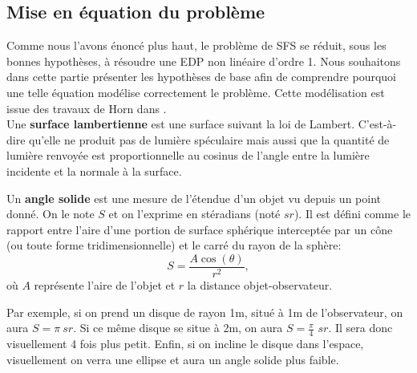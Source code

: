 \subsection{Mise en équation du problème} 

Comme nous l'avons énoncé plus haut, le problème de SFS se réduit, sous les bonnes hypothèses, à résoudre une EDP non linéaire d'ordre 1. Nous souhaitons dans cette partie présenter les hypothèses de base afin de comprendre pourquoi une telle équation modélise correctement le problème. Cette modélisation est issue des travaux de Horn dans \cite{Horn 1986}.\\

Une \textbf{surface lambertienne} est une surface suivant la loi de Lambert. C'est-à-dire qu'elle ne produit pas de lumière spéculaire mais aussi que la quantité de lumière renvoyée est proportionnelle au cosinus de l’angle entre la lumière incidente et la normale à la surface. 

Un \textbf{angle solide} est une mesure de l'étendue d'un objet vu depuis un point donné. On le note $S$ et on l'exprime en stéradians (noté \(sr\)). Il est défini comme le rapport entre l'aire d'une portion de surface sphérique interceptée par un cône (ou toute forme tridimensionnelle) et le carré du rayon de la sphère: 
\begin{equation*}
    S=\frac{A \cos\left(\theta\right)}{r^2},
\end{equation*}
où $A$ représente l'aire de l'objet et $r$ la distance objet-observateur.

Par exemple, si on prend un disque de rayon 1m, situé à 1m de l'observateur, on aura $S={\pi} \ sr$. Si ce même disque se situe à 2m, on aura $S=\frac{\pi}{4}$ \(sr\). Il sera donc visuellement 4 fois plus petit. Enfin, si on incline le disque dans l'espace, visuellement on verra une ellipse et aura un angle solide plus faible.

